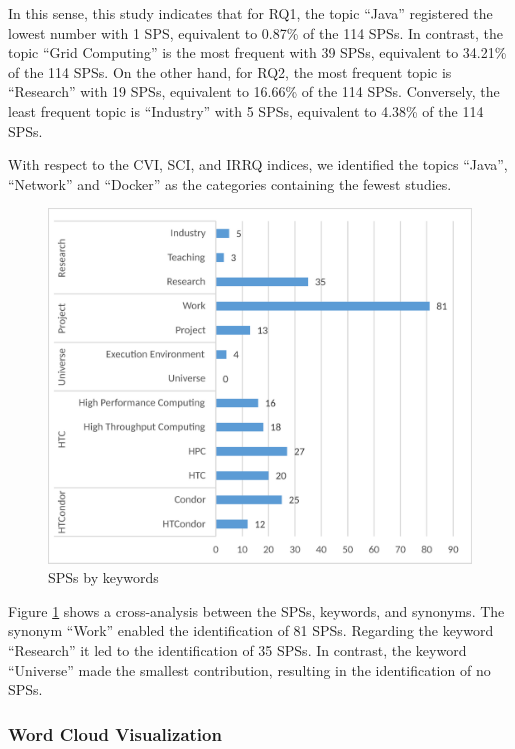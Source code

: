In this sense, this study indicates that for RQ1, the topic ``Java'' registered the lowest number with 1 SPS, equivalent to 0.87\% of the 114 SPSs. In contrast, the topic ``Grid Computing'' is the most frequent with 39 SPSs, equivalent to 34.21\% of the 114 SPSs. On the other hand, for RQ2, the most frequent topic is ``Research'' with 19 SPSs, equivalent to 16.66\% of the 114 SPSs. Conversely, the least frequent topic is ``Industry'' with 5 SPSs, equivalent to 4.38\% of the 114 SPSs.

With respect to the CVI, SCI, and IRRQ indices, we identified the topics ``Java'', ``Network'' and ``Docker'' as the categories containing the fewest studies.

\begin{figure}[ht]
	\centering
	\includegraphics[scale=0.179]{resources/figures/Imagen6.eps}
	\caption{SPSs by keywords}
	\label{fig:SPSsByKeywords}
\end{figure}

Figure \ref{fig:SPSsByKeywords} shows a cross-analysis between the SPSs, keywords, and synonyms. The synonym ``Work'' enabled the identification of 81 SPSs. Regarding the keyword ``Research'' it led to the identification of 35 SPSs. In contrast, the keyword ``Universe'' made the smallest contribution, resulting in the identification of no SPSs.

\subsubsection{Word Cloud Visualization}

